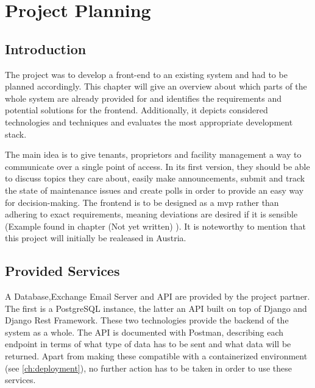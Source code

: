 \chapter[Project Planning]{Project Planning}

\section{Introduction}
The project was to develop a front-end to an existing system and had to be planned accordingly. This chapter will give an overview about which parts of the whole system are already provided for and identifies the requirements and potential solutions for the frontend. Additionally, it depicts considered technologies and techniques and evaluates the most appropriate development stack.

The main idea is to give tenants, proprietors and facility management a way to communicate over a single point of access. In its first version, they should be able to discuss topics they care about, easily make announcements, submit and track the state of maintenance issues and create polls in order to provide an easy way for decision-making. The frontend is to be designed as a \acrfull{mvp} rather than adhering to exact requirements, meaning deviations are desired if it is sensible (Example found in chapter (Not yet written) ). It is noteworthy to mention that this project will initially be realeased in Austria.

\section{Provided Services}
A Database,Exchange Email Server and API are provided by the project partner. The first is a PostgreSQL instance, the latter an API built on top of Django and Django Rest Framework. These two technologies provide the backend of the system as a whole. The API is documented with Postman, describing each endpoint in terms of what type of data has to be sent and what data will be returned. Apart from making these compatible with a containerized environment (see \autoref{ch:deployment}), no further action has to be taken in order to use these services.

